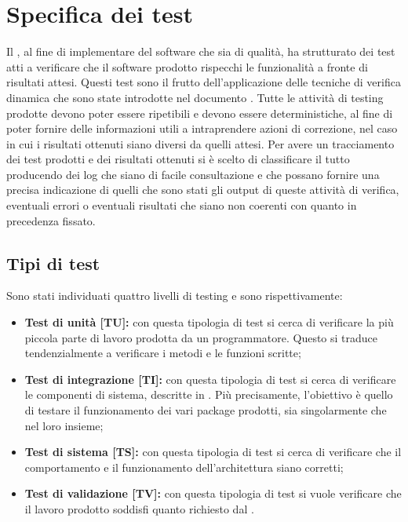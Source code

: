 \section{Specifica dei test}\label{pianificazioneTest}
Il  \gruppo, al fine di implementare del software che sia di qualità, ha strutturato dei test atti a verificare che il software prodotto rispecchi le funzionalità a fronte di risultati attesi.
Questi test sono il frutto dell'applicazione delle tecniche di verifica dinamica che sono state introdotte nel documento \normeDiProgetto.
Tutte le attività di testing prodotte devono poter essere ripetibili e devono essere deterministiche, al fine di poter fornire delle informazioni utili a intraprendere azioni di correzione, nel caso in cui i risultati ottenuti siano diversi da quelli attesi.
Per avere un tracciamento dei test prodotti e dei risultati ottenuti si è scelto di classificare il tutto producendo dei log che siano di facile consultazione e che possano fornire una precisa indicazione di quelli che sono stati gli output di queste attività di verifica, eventuali errori o eventuali risultati che siano non coerenti con quanto in precedenza fissato.
\subsection{Tipi di test}
Sono stati individuati quattro livelli di testing e sono rispettivamente:
\begin{itemize}
\item \textbf{Test di unità [TU]:} con questa tipologia di test si cerca di verificare la più piccola parte di lavoro prodotta da un programmatore. Questo si traduce tendenzialmente a verificare i metodi e le funzioni scritte;
\item \textbf{Test di integrazione [TI]:} con questa tipologia di test si cerca di verificare le componenti di sistema, descritte in \specificaTecnica. Più precisamente, l'obiettivo è quello di testare il funzionamento dei vari package prodotti, sia singolarmente che nel loro insieme;
\item \textbf{Test di sistema [TS]:} con questa tipologia di test si cerca di verificare che il comportamento e il funzionamento dell'architettura siano corretti;
\item \textbf{Test di validazione [TV]:} con questa tipologia di test si vuole verificare che il lavoro prodotto soddisfi quanto richiesto dal .
\end{itemize}

